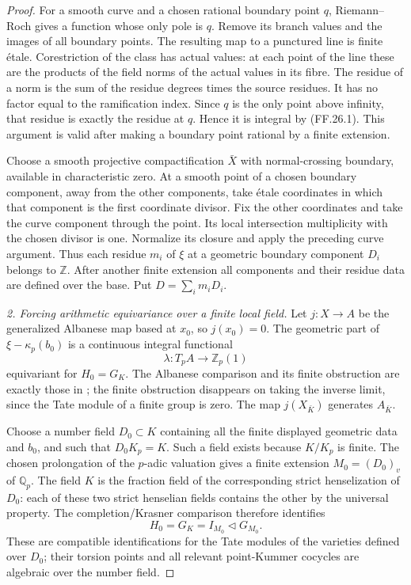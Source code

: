\begin{proof}
For a smooth curve and a chosen rational boundary point
\(q\), Riemann--Roch gives a function whose only pole
is \(q\). Remove its branch values and the images of
all boundary points. The resulting map to a punctured
line is finite \'etale. Corestriction of the class has
actual values: at each point of the line these are the
products of the field norms of the actual values in its
fibre. The residue of a norm is the sum of the residue
degrees times the source residues. It has no factor
equal to the ramification index. Since \(q\) is the
only point above infinity, that residue is exactly
the residue at \(q\). Hence it is integral by (FF.26.1).
This argument is valid after making a boundary point
rational by a finite extension.

Choose a smooth projective compactification \(\bar X\)
with normal-crossing boundary, available in characteristic
zero. At a smooth point of a chosen boundary component,
away from the other components, take \'etale coordinates
in which that component is the first coordinate divisor.
Fix the other coordinates and take the curve component
through the point. Its local intersection multiplicity
with the chosen divisor is one. Normalize its closure
and apply the preceding curve argument. Thus each residue
\(m_i\) of \(\xi\) at a geometric boundary component
\(D_i\) belongs to \(\mathbb Z\). After another finite
extension all components and their residue data are defined
over the base. Put \(D=\sum_i m_iD_i\).

\emph{2. Forcing arithmetic equivariance over a finite local field.}
Let \(j:X\to A\) be the generalized Albanese map based
at \(x_0\), so \(j(x_0)=0\). The geometric part of
\(\xi-\kappa_p(b_0)\) is a continuous integral functional
\[
                  \lambda:T_pA\longrightarrow\mathbb Z_p(1)
\]
equivariant for \(H_0=G_K\). The Albanese comparison and
its finite obstruction are exactly those in
\citet[Proposition~4.1 and Corollary~4.2]{FF_SpiessSzamuely2003};
the finite obstruction disappears on taking the inverse
limit, since the Tate module of a finite group is zero.
The map \(j(X_{\bar K})\) generates \(A_{\bar K}\).

Choose a number field \(D_0\subset K\) containing all
the finite displayed geometric data and \(b_0\), and
such that \(D_0K_p=K\). Such a field exists because
\(K/K_p\) is finite. The chosen prolongation of the
\(p\)-adic valuation gives a finite extension
\(M_0=(D_0)_v\) of \(\mathbb Q_p\). The field \(K\)
is the fraction field of the corresponding strict
henselization of \(D_0\): each of these two strict
henselian fields contains the other by the universal
property. The completion/Krasner comparison therefore
identifies
\[
                  H_0=G_K=I_{M_0}\triangleleft G_{M_0}.
                                                               \tag{FF.26.2}
\]
These are compatible identifications for the Tate modules
of the varieties defined over \(D_0\); their torsion
points and all relevant point-Kummer cocycles are algebraic
over the number field.


\end{proof}
